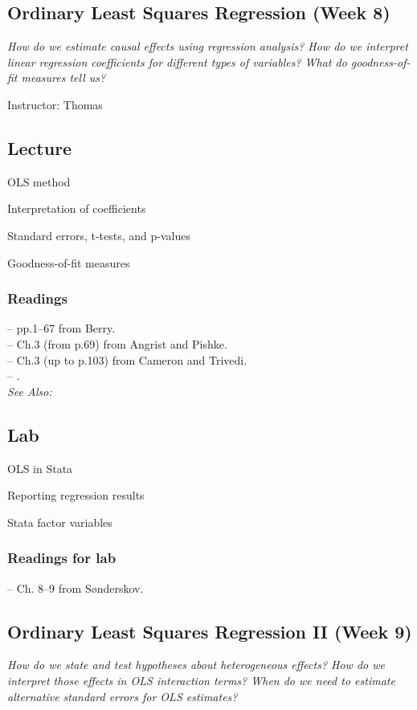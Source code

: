 \documentclass[11pt,a4paper]{article}
\newcommand{\reading}[2][]{\noindent -- {#1}\bibentry{#2}.\vspace{.25em}\\}
\newcommand{\textbook}[2][]{\noindent -- {#1}#2.\vspace{.25em}\\}
\newcommand{\thomas}{\vspace{1em}\noindent Instructor: Thomas\vspace{1em}\\}
\newcommand{\seealso}{\noindent \emph{See Also:}\\}
\begin{document}
\clearpage
\subsection{Ordinary Least Squares Regression (Week 8)}
\emph{How do we estimate causal effects using regression analysis? How do we interpret linear regression coefficients for different types of variables? What do goodness-of-fit measures tell us?}

\thomas

\subsection*{Lecture}

\begin{itemize*}
\item OLS method
\item Interpretation of coefficients
\item Standard errors, t-tests, and p-values
\item Goodness-of-fit measures
\end{itemize*}

\subsubsection*{Readings}
\textbook[pp.1--67 from ]{Berry}
\textbook[Ch.3 (from p.69) from ]{Angrist and Pishke}
\textbook[Ch.3 (up to p.103) from ]{Cameron and Trivedi}
\reading{Englebert2000}


\seealso

\subsection*{Lab}
\begin{itemize*}
\item OLS in Stata
\item Reporting regression results
\item Stata factor variables
\end{itemize*}


\subsubsection*{Readings for lab}
\textbook[Ch. 8--9 from ]{S{\o}nderskov}




\clearpage
\subsection{Ordinary Least Squares Regression II (Week 9)}
\emph{How do we state and test hypotheses about heterogeneous effects? How do we interpret those effects in OLS interaction terms? When do we need to estimate alternative standard errors for OLS estimates?}
\end{document}
